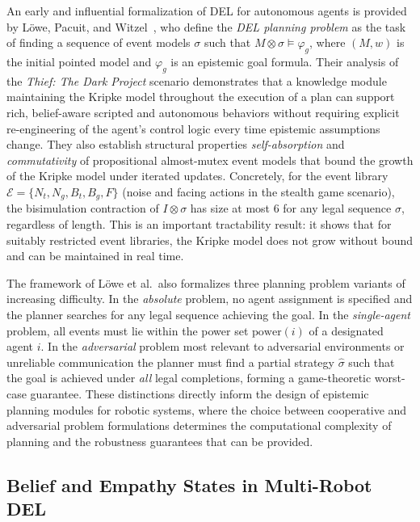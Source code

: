 \documentclass[12pt,a4paper]{article}
\theoremstyle{definition}
\theoremstyle{plain}
\begin{document}
An early and influential formalization of DEL for autonomous agents is provided
by L{\"o}we, Pacuit, and Witzel~\cite{lowe2010planning}, who define the \emph{DEL
planning problem} as the task of finding a sequence of event models $\sigma$ such that
$M \otimes \sigma \models \varphi_g$, where $(M, w)$ is the initial pointed model and
$\varphi_g$ is an epistemic goal formula. Their analysis of the \textit{Thief: The Dark
Project} scenario demonstrates that a knowledge module maintaining the Kripke model
throughout the execution of a plan can support rich, belief-aware scripted and autonomous
behaviors without requiring explicit re-engineering of the agent's control logic every
time epistemic assumptions change. They also establish structural properties \textit{self-absorption}
and \textit{commutativity} of propositional almost-mutex event models that bound the growth of
the Kripke model under iterated updates. Concretely, for the event library
$\mathcal{E} = \{N_t, N_g, B_t, B_g, F\}$ (noise and facing actions in the stealth game scenario),
the bisimulation contraction of $I \otimes \sigma$ has size at most 6 for any legal sequence
$\sigma$, regardless of length. This is an important tractability result: it shows that for
suitably restricted event libraries, the Kripke model does not grow without bound and can be
maintained in real time.

The framework of L{\"o}we et al.\ also formalizes three planning problem variants of increasing
difficulty. In the \emph{absolute} problem, no agent assignment is specified and the planner
searches for any legal sequence achieving the goal. In the \emph{single-agent} problem, all
events must lie within the power set $\mathrm{power}(i)$ of a designated agent $i$. In the
\emph{adversarial} problem most relevant to adversarial environments or unreliable
communication the planner must find a partial strategy $\hat\sigma$ such that the goal is
achieved under \emph{all} legal completions, forming a game-theoretic worst-case guarantee.
These distinctions directly inform the design of epistemic planning modules for robotic systems,
where the choice between cooperative and adversarial problem formulations determines the
computational complexity of planning and the robustness guarantees that can be provided.

\subsection{Belief and Empathy States in Multi-Robot DEL}
\label{subsec:belief_empathy}
\end{document}
